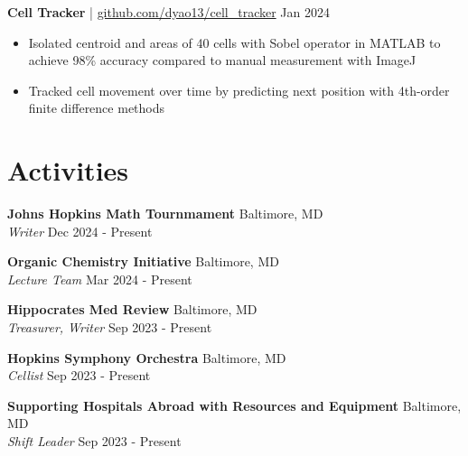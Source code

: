\documentclass[11pt]{article}       %
\begin{document}
\textbf{Cell Tracker} | \href{https://github.com/dyao13/cell_tracker}{github.com/dyao13/cell\_tracker} \hfill Jan 2024 \vspace{-9pt} \\
\begin{itemize}
  \item Isolated centroid and areas of 40 cells with Sobel operator in MATLAB to achieve 98\% accuracy compared to manual measurement with ImageJ
  \item Tracked cell movement over time by predicting next position with 4th-order finite difference methods
\end{itemize}

\vspace{-18.5pt}

\section*{Activities}
\textbf{Johns Hopkins Math Tournmament} \hfill Baltimore, MD \\
\textit{Writer} \hfill Dec 2024 - Present \\

\vspace{5pt}

\textbf{Organic Chemistry Initiative} \hfill Baltimore, MD \\
\textit{Lecture Team} \hfill Mar 2024 - Present \\

\vspace{5pt}

\textbf{Hippocrates Med Review} \hfill Baltimore, MD \\
\textit{Treasurer, Writer} \hfill Sep 2023 - Present \\

\vspace{5pt}

\textbf{Hopkins Symphony Orchestra} \hfill Baltimore, MD \\
\textit{Cellist} \hfill Sep 2023 - Present \\

\vspace{5pt}

\textbf{Supporting Hospitals Abroad with Resources and Equipment} \hfill Baltimore, MD \\
\textit{Shift Leader} \hfill Sep 2023 - Present \\

\vspace{-9pt}
\end{document}
